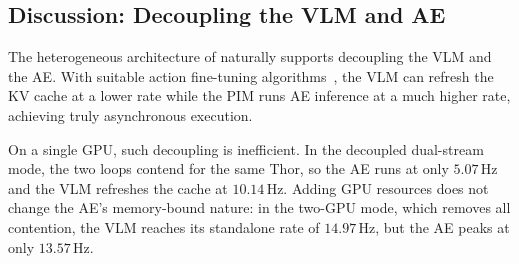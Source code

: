 
\subsection{Discussion: Decoupling the VLM and AE}
\label{sec:evaluation-c}


The heterogeneous architecture of \sys{} naturally supports decoupling the VLM and the AE. With suitable action fine-tuning algorithms~\cite{eaglevla,duocore_fs}, the VLM can refresh the KV cache at a lower rate while the PIM runs AE inference at a much higher rate, achieving truly asynchronous execution.

On a single GPU, such decoupling is inefficient. In the decoupled dual-stream mode, the two loops contend for the same Thor, so the AE runs at only $5.07\,\mathrm{Hz}$ and the VLM refreshes the cache at $10.14\,\mathrm{Hz}$. Adding GPU resources does not change the AE's memory-bound nature: in the two-GPU mode, which removes all contention, the VLM reaches its standalone rate of $14.97\,\mathrm{Hz}$, but the AE peaks at only $13.57\,\mathrm{Hz}$.

